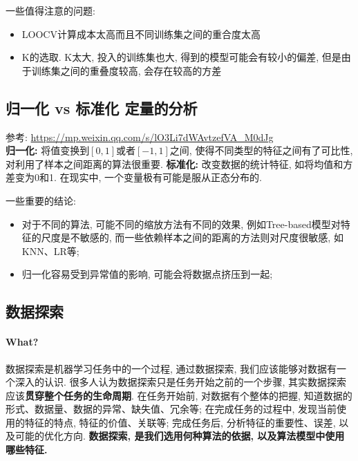 一些值得注意的问题: 
\begin{itemize}
	\item LOOCV计算成本太高而且不同训练集之间的重合度太高
	\item K的选取. K太大, 投入的训练集也大, 得到的模型可能会有较小的偏差, 但是由于训练集之间的重叠度较高, 会存在较高的方差
\end{itemize}

\subsection{归一化 vs 标准化 定量的分析}
参考: \href{https://mp.weixin.qq.com/s/lO3Li7dWAvtzefVA_M0dJg}{https://mp.weixin.qq.com/s/lO3Li7dWAvtzefVA\_M0dJg}\\
\textbf{归一化: }将值变换到$[0, 1]$或者$[-1, 1]$之间, 使得不同类型的特征之间有了可比性, 对利用了样本之间距离的算法很重要. \textbf{标准化: }改变数据的统计特征, 如将均值和方差变为0和1. 在现实中, 一个变量极有可能是服从正态分布的. 


一些重要的结论: 
\begin{itemize}
	\item 对于不同的算法, 可能不同的缩放方法有不同的效果, 例如Tree-based模型对特征的尺度是不敏感的, 而一些依赖样本之间的距离的方法则对尺度很敏感, 如KNN、LR等; 
	\item 归一化容易受到异常值的影响, 可能会将数据点挤压到一起; 
\end{itemize}

\subsection{数据探索}
\paragraph{What?}数据探索是机器学习任务中的一个过程, 通过数据探索, 我们应该能够对数据有一个深入的认识. 很多人认为数据探索只是任务开始之前的一个步骤, 其实数据探索应该\textbf{贯穿整个任务的生命周期}. 在任务开始前, 对数据有个整体的把握, 知道数据的形式、数据量、数据的异常、缺失值、冗余等; 在完成任务的过程中, 发现当前使用的特征的特点, 特征的价值、关联等; 完成任务后, 分析特征的重要性、误差, 以及可能的优化方向. \textbf{数据探索, 是我们选用何种算法的依据, 以及算法模型中使用哪些特征. }

